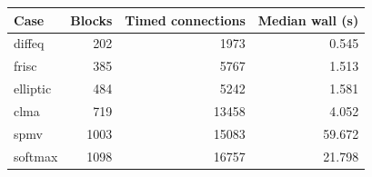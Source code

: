 \begin{tabular}{lrrr}
\toprule
Case & Blocks & Timed connections & Median wall (s) \\
\midrule
diffeq & 202 & 1973 & 0.545 \\
frisc & 385 & 5767 & 1.513 \\
elliptic & 484 & 5242 & 1.581 \\
clma & 719 & 13458 & 4.052 \\
spmv & 1003 & 15083 & 59.672 \\
softmax & 1098 & 16757 & 21.798 \\
\bottomrule
\end{tabular}
